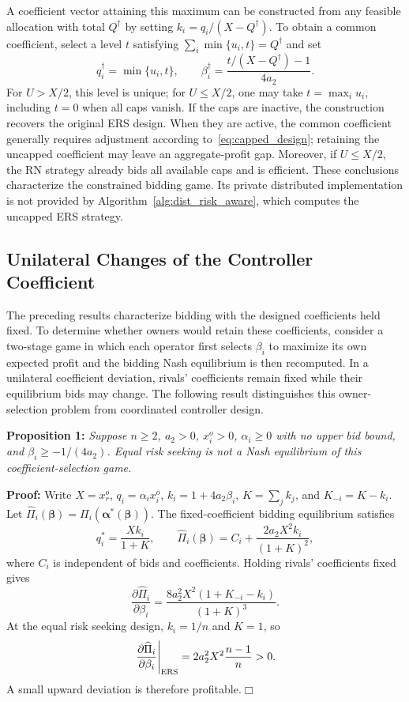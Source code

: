 \documentclass[journal]{IEEEtran}
\begin{document}
A coefficient vector attaining this maximum can be constructed from any feasible allocation with total $Q^\dagger$ by setting $k_i=q_i/(X-Q^\dagger)$. To obtain a common coefficient, select a level $t$ satisfying $\sum_i\min\{u_i,t\}=Q^\dagger$ and set
\begin{equation}
 q_i^\dagger=\min\{u_i,t\},\qquad
 \beta_i^\dagger=\frac{t/(X-Q^\dagger)-1}{4a_2}.
 \label{eq:capped_common}
\end{equation}
For $U> X/2$, this level is unique; for $U\leq X/2$, one may take $t=\max_i u_i$, including $t=0$ when all caps vanish. If the caps are inactive, the construction recovers the original ERS design. When they are active, the common coefficient generally requires adjustment according to~\eqref{eq:capped_design}; retaining the uncapped coefficient may leave an aggregate-profit gap. Moreover, if $U\leq X/2$, the RN strategy already bids all available caps and is efficient. These conclusions characterize the constrained bidding game. Its private distributed implementation is not provided by Algorithm~\ref{alg:dist_risk_aware}, which computes the uncapped ERS strategy.

\subsection{Unilateral Changes of the Controller Coefficient}
\label{sec:beta_deviation}
The preceding results characterize bidding with the designed coefficients held fixed. To determine whether owners would retain these coefficients, consider a two-stage game in which each operator first selects $\beta_i$ to maximize its own expected profit and the bidding Nash equilibrium is then recomputed. In a unilateral coefficient deviation, rivals' coefficients remain fixed while their equilibrium bids may change. The following result distinguishes this owner-selection problem from coordinated controller design.

\noindent\textbf{Proposition 1:} \textit{Suppose $n\geq2$, $a_2>0$, $x_i^o>0$, $\alpha_i\geq0$ with no upper bid bound, and $\beta_i\geq-1/(4a_2)$. Equal risk seeking is not a Nash equilibrium of this coefficient-selection game.}

\noindent\textbf{Proof:} Write $X=x_r^o$, $q_i=\alpha_i x_i^o$, $k_i=1+4a_2\beta_i$, $K=\sum_jk_j$, and $K_{-i}=K-k_i$. Let $\widehat\Pi_i(\boldsymbol\beta)=\Pi_i(\boldsymbol\alpha^*(\boldsymbol\beta))$. The fixed-coefficient bidding equilibrium satisfies
\begin{equation}
q_i^*=\frac{Xk_i}{1+K},\qquad
\widehat\Pi_i(\boldsymbol\beta)=C_i+\frac{2a_2X^2k_i}{(1+K)^2},
\end{equation}
where $C_i$ is independent of bids and coefficients. Holding rivals' coefficients fixed gives
\begin{equation}
\frac{\partial\widehat\Pi_i}{\partial\beta_i}
=\frac{8a_2^2X^2(1+K_{-i}-k_i)}{(1+K)^3}.
\end{equation}
At the equal risk seeking design, $k_i=1/n$ and $K=1$, so
\begin{equation}
\left.\frac{\partial\widehat\Pi_i}{\partial\beta_i}\right|_{\rm ERS}
=2a_2^2X^2\frac{n-1}{n}>0.
\end{equation}
A small upward deviation is therefore profitable.\hfill$\Box$
\end{document}
